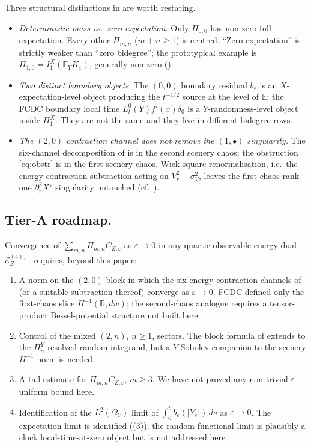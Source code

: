 \documentclass[11pt,reqno]{amsart}
\theoremstyle{plain}
\theoremstyle{definition}
\theoremstyle{remark}
\newcommand{\R}{\mathbb{R}}
\newcommand{\E}{\mathbb{E}}
\newcommand{\Energy}{\mathcal{E}}
\newcommand{\IBM}{Z}
\newcommand{\Pir}{\Pi}
\begin{document}
Three structural distinctions in  are worth
restating.
\begin{itemize}
\item \emph{Deterministic mass vs.\ zero expectation.} Only
$\Pir_{0,0}$ has non-zero full expectation. Every other $\Pir_{m,n}$
($m+n\ge 1$) is centred. ``Zero expectation'' is strictly weaker
than ``zero bidegree''; the prototypical example is $\Pir_{1,0}=
I_1^X(\E_Y K_\varepsilon)$, generally non-zero
().
\item \emph{Two distinct boundary objects.} The $(0,0)$ boundary
residual $b_\varepsilon$ is an $X$-expectation-level object
producing the $t^{-1/2}$ source at the level of $\E$;
the FCDC boundary local time
$L_t^0(Y)f'(x)\delta_0$ is a $Y$-randomness-level object inside
$\Pir_1^X$. They are not the same and they live in different
bidegree rows.
\item \emph{The $(2,0)$ contraction channel does not remove the
$(1,\bullet)$ singularity.} The six-channel decomposition of
 is in the second scenery chaos; the obstruction
\eqref{eq:obstr} is in the first scenery chaos. Wick-square
renormalisation, i.e.\ the energy-contraction subtraction acting on
$V_r^2-\sigma_V^2$, leaves the first-chaos rank-one
$\partial_r^2X^\varepsilon$ singularity untouched
(cf.~\cite[Prop.\ 8.4]{Fontes-EnergyFirst}).
\end{itemize}

\subsection*{Tier-A roadmap.}
Convergence of $\sum_{m,n}\Pir_{m,n}C_{\IBM,\varepsilon}$ as
$\varepsilon\to 0$ in any quartic observable-energy dual
$\Energy_\IBM^{(4),-}$ requires, beyond this paper:
\begin{enumerate}
\item A norm on the $(2,0)$ block in which the six energy-contraction
channels of  (or a suitable subtraction thereof)
converge as $\varepsilon\to 0$. FCDC defined only the first-chaos
slice $H^{-1}(\R,dw)$; the second-chaos analogue requires a
tensor-product Bessel-potential structure not built here.
\item Control of the mixed $(2,n)$, $n\ge 1$, sectors. The block
formula of  extends to the $\Pir_n^Y$-resolved
random integrand, but a $Y$-Sobolev companion to the scenery
$H^{-1}$ norm is needed.
\item A tail estimate for $\Pir_{m,n}C_{\IBM,\varepsilon}$,
$m\ge 3$. We have not proved any non-trivial $\varepsilon$-uniform
bound here.
\item Identification of the $L^{2}(\Omega_Y)$ limit of
$\int_0^t b_\varepsilon(|Y_s|)\,ds$ as $\varepsilon\to 0$. The
expectation limit is identified ((3)); the
random-functional limit is plausibly a clock local-time-at-zero
object but is not addressed here.
\end{enumerate}
\end{document}
